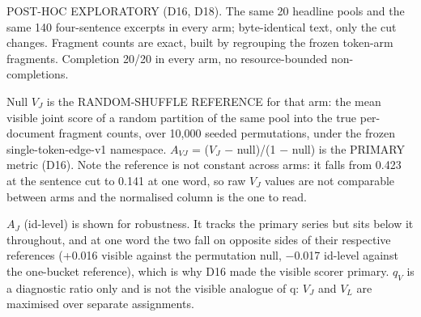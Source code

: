 \begin{strip}
\centering
\footnotesize
\setlength{\tabcolsep}{3pt}
\label{tab:gradient}
\ifdim\wd0>\textwidth\resizebox{\textwidth}{!}{\usebox0}\else\usebox0\fi
\end{strip}
\begingroup\footnotesize\setlength{\parindent}{0pt}
\setlength{\parskip}{1pt plus 1pt}
POST-HOC EXPLORATORY (D16, D18). The same 20 headline pools and the same 140 four-sentence excerpts in every arm; byte-identical text, only the cut changes. Fragment counts are exact, built by regrouping the frozen token-arm fragments. Completion 20/20 in every arm, no resource-bounded non-completions.\par
Null $V_{J}$ is the RANDOM-SHUFFLE REFERENCE for that arm: the mean visible joint score of a random partition of the same pool into the true per-document fragment counts, over 10,000 seeded permutations, under the frozen single-token-edge-v1 namespace. $A_{VJ}$ = ($V_{J}$ $-$ null)/(1 $-$ null) is the PRIMARY metric (D16). Note the reference is not constant across arms: it falls from 0.423 at the sentence cut to 0.141 at one word, so raw $V_{J}$ values are not comparable between arms and the normalised column is the one to read.\par
$A_{J}$ (id-level) is shown for robustness. It tracks the primary series but sits below it throughout, and at one word the two fall on opposite sides of their respective references (+0.016 visible against the permutation null, $-$0.017 id-level against the one-bucket reference), which is why D16 made the visible scorer primary. $q_{V}$ is a diagnostic ratio only and is not the visible analogue of q: $V_{J}$ and $V_{L}$ are maximised over separate assignments.\par
